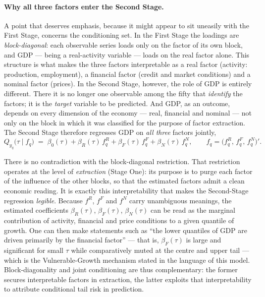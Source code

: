 \documentclass[11pt, a4paper, oneside]{article}
\begin{document}
\paragraph{Why all three factors enter the Second Stage.}
A point that deserves emphasis, because it might appear to sit
uneasily with the First Stage, concerns the conditioning set. In the
First Stage the loadings are \emph{block-diagonal}: each observable
series loads only on the factor of its own block, and GDP --- being a
real-activity variable --- loads on the real factor alone. This
structure is what makes the three factors interpretable as a real
factor (activity: production, employment), a financial factor
(credit and market conditions) and a nominal factor (prices). In the
Second Stage, however, the role of GDP is entirely different. There
it is no longer one observable among the fifty that \emph{identify}
the factors; it is the \emph{target} variable to be predicted. And
GDP, as an outcome, depends on every dimension of the economy ---
real, financial and nominal --- not only on the block in which it was
classified for the purpose of factor extraction. The Second Stage
therefore regresses GDP on \emph{all three} factors jointly,
\[
Q_{y_q}\!\big(\tau \mid f_q\big)
\;=\;
\beta_0(\tau)
+ \beta_R(\tau)\, f^{R}_{q}
+ \beta_F(\tau)\, f^{F}_{q}
+ \beta_N(\tau)\, f^{N}_{q},
\qquad
f_q = \big(f^{R}_{q},\, f^{F}_{q},\, f^{N}_{q}\big)'.
\]

There is no contradiction with the block-diagonal restriction. That
restriction operates at the level of \emph{extraction} (Stage One):
its purpose is to purge each factor of the influence of the other
blocks, so that the estimated factors admit a clean economic reading.
It is exactly this interpretability that makes the Second-Stage
regression \emph{legible}. Because $f^{R}$, $f^{F}$ and $f^{N}$ carry
unambiguous meanings, the estimated coefficients $\beta_R(\tau)$,
$\beta_F(\tau)$, $\beta_N(\tau)$ can be read as the marginal
contribution of activity, financial and price conditions to a given
quantile of growth. One can then make statements such as ``the lower
quantiles of GDP are driven primarily by the financial factor'' ---
that is, $\beta_F(\tau)$ is large and significant for small $\tau$
while comparatively muted at the centre and upper tail --- which is
the Vulnerable-Growth mechanism stated in the language of this model.
Block-diagonality and joint conditioning are thus complementary: the
former secures interpretable factors in extraction, the latter
exploits that interpretability to attribute conditional tail risk in
prediction.
\end{document}
